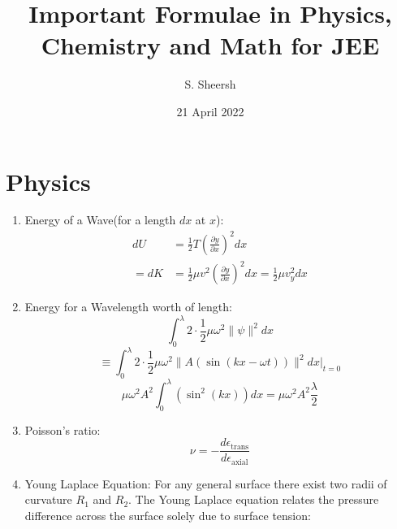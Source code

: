 \documentclass{article}
\title{\textbf{Important Formulae in Physics, Chemistry and Math for JEE}}
\author{S. Sheersh}
\date{21 April 2022}
\numberwithin{equation}{section}
\numberwithin{figure}{section}
\begin{document}
\maketitle
\section{Physics}
\begin{enumerate}

	\item Energy of a Wave(for a length $dx$ at $x$): 
		\begin{align}
			dU &=\frac{1}{2}T\left(\frac{\partial y}{\partial x} \right)^2dx\\
			=dK &=\frac{1}{2} \mu v^2 \left(\frac{\partial y}{\partial x} \right)^2dx=\frac{1}{2}\mu v^2_{y} dx
		\end{align}

	\item Energy for a Wavelength worth of length: 
\begin{equation}
 \int_{0}^{\lambda}2\cdot\frac{1}{2}\mu \omega^2\|\psi\|^2 dx
\end{equation}
\begin{equation}
\equiv  \int_{0}^{\lambda}2\cdot\frac{1}{2}\mu \omega^2\| A(\sin(kx-\omega t))\|^2 dx\bigg |_{t=0} 
\end{equation}
\begin{equation}
	\mu \omega^2 A^2 \int_{0}^{\lambda}(\sin^2(kx))dx=\boxed{\mu \omega^2 A^2 \frac{\lambda}{2}} 
\end{equation}
\item Poisson's ratio:
\begin{equation}
	\nu=-\frac{d \epsilon_{\text{trans}}}{d\epsilon_{\text{axial}}}	
\end{equation}
	\item Young Laplace Equation:
		For any general surface there exist two radii of curvature $R_1$ and $R_2$. The Young Laplace equation relates the pressure difference across the surface solely due to surface tension:


\end{enumerate}
\end{document}
